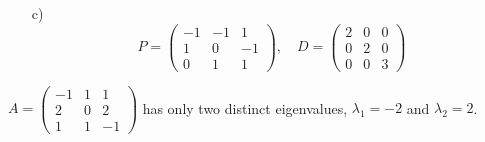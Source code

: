 {\begin{enumerate}
        A vector that is a basis for the eigenspace is $$v_3 = \begin{pmatrix} -1\\-1\\1\end{pmatrix}$$ But any non-zero multiple is also ok. 
        \item[c)] $$P = \begin{pmatrix} -1&-1&1\\1&0&-1\\0&1&1\end{pmatrix}, \quad D = \begin{pmatrix} 2&0&0\\0&2&0\\0&0&3\end{pmatrix}$$
    \end{enumerate}
    } 
   \fi
\fi 

\ifnum {}
 \question[3] 
$A = \begin{pmatrix}-1&1&1\\2&0&2\\1&1&-1 \end{pmatrix}$ has only two distinct eigenvalues, $\lambda_1 = -2$ and $\lambda_2 = 2$.   

